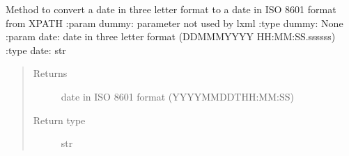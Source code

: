 
\begin{fulllineitems}
\label{\detokenize{s2boa.ingestions:s2boa.ingestions.xpath_functions.three_letter_to_iso_8601}}
Method to convert a date in three letter format to a date in ISO 8601 format from XPATH
:param dummy: parameter not used by lxml
:type dummy: None
:param date: date in three letter format (DD\sphinxhyphen{}MMM\sphinxhyphen{}YYYY HH:MM:SS.ssssss)
:type date: str
\begin{quote}\begin{description}
\item[{Returns}] \leavevmode
date in ISO 8601 format (YYYY\sphinxhyphen{}MM\sphinxhyphen{}DDTHH:MM:SS)

\item[{Return type}] \leavevmode
str

\end{description}\end{quote}

\end{fulllineitems}



